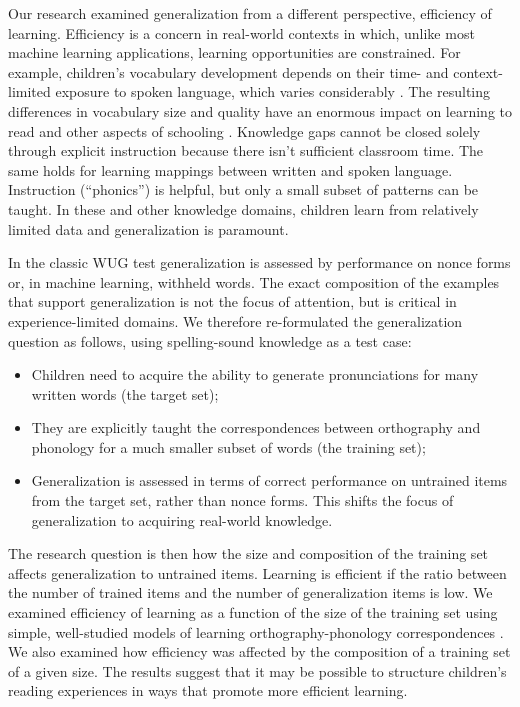 \documentclass[10pt,letterpaper]{article}
\begin{document}
Our research examined generalization from a different perspective, efficiency of learning.   Efficiency is a concern in real-world contexts in which, unlike most machine learning applications, learning opportunities are constrained. For example, children's vocabulary development depends on their time- and context-limited exposure to spoken language, which varies considerably \cite{Hart1995,Gilkerson2017}.  The resulting differences in vocabulary size and quality have an enormous impact on learning to read and other aspects of schooling \cite{Seidenberg2017}.  Knowledge gaps cannot be closed solely through explicit instruction because there isn't sufficient classroom time. The same holds for learning mappings between written and spoken language. Instruction (``phonics'') is helpful, but only a small subset of patterns can be taught. In these and other knowledge domains, children learn from relatively limited data and generalization is paramount.

In the classic WUG test generalization is assessed by performance on nonce forms or, in machine learning, withheld words. The exact composition of the examples that support generalization is not the focus of attention, but is critical in experience-limited domains. We therefore re-formulated the generalization question as follows, using spelling-sound knowledge as a test case: 

\begin{itemize}
	\item Children need to acquire the ability to generate pronunciations for many written words (the target set);  
	\item They are explicitly taught the correspondences between orthography and phonology for a much smaller subset of words (the training set);
	\item Generalization is assessed in terms of correct performance on untrained items from the target set, rather than nonce forms. This shifts the focus of generalization to acquiring real-world knowledge.
\end{itemize}

The research question is then how the size and composition of the training set affects generalization to untrained items. Learning is efficient if the ratio between the number of trained items and the number of generalization items is low. We examined efficiency of learning as a function of the size of the training set using simple, well-studied models of learning orthography-phonology correspondences \cite{Seidenberg1989,Harm1999}. We also examined how efficiency was affected by the composition of a training set of a given size. The results suggest that it may be possible to structure children's reading experiences in ways that promote more efficient learning.
\end{document}

